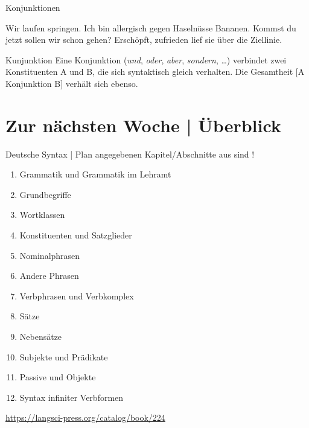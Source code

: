 \begin{frame}
  {Konjunktionen}
  \onslide<+->
  \onslide<+->
  \begin{exe}
    \ex
    \begin{xlist}
      \ex Wir \alert{laufen}  \alert{springen}.
      \ex Ich bin allergisch gegen \alert{Haselnüsse}  \alert{Bananen}.
      \ex \alert{Kommst du jetzt}  \alert{sollen wir schon gehen}?
      \ex \alert{Erschöpft},  \alert{zufrieden} lief sie über die Ziellinie.
    \end{xlist}
  \end{exe}
  \onslide<+->
  \begin{block}{Kunjunktion}
    Eine Konjunktion (\textit{und}, \textit{oder}, \textit{aber}, \textit{sondern}, \ldots) verbindet zwei Konstituenten A und B, die sich syntaktisch gleich verhalten. Die Gesamtheit [A Konjunktion B] verhält sich ebenso.
  \end{block}
\end{frame}


\section{Zur nächsten Woche | Überblick}

\begin{frame}
  {Deutsche Syntax | Plan}
   angegebenen Kapitel\slash Abschnitte aus  sind !\\
  \Halbzeile
  \begin{enumerate}
    \item Grammatik und Grammatik im Lehramt 
    \item Grundbegriffe 
    \item Wortklassen 
    \item \alert{Konstituenten und Satzglieder} 
    \item Nominalphrasen 
    \item Andere Phrasen 
    \item Verbphrasen und Verbkomplex 
    \item Sätze  
    \item Nebensätze 
    \item Subjekte und Prädikate 
    \item Passive und Objekte 
    \item Syntax infiniter Verbformen 
  \end{enumerate}
  \Halbzeile
  \centering 
  \url{https://langsci-press.org/catalog/book/224}
\end{frame}
